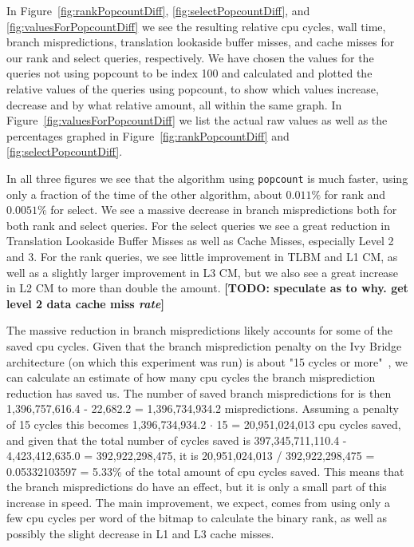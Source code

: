 In Figure~\ref{fig:rankPopcountDiff}, \ref{fig:selectPopcountDiff}, and \ref{fig:valuesForPopcountDiff} we see the resulting relative cpu cycles, wall time, branch mispredictions, translation lookaside buffer misses, and cache misses for our rank and select queries, respectively.
We have chosen the values for the queries not using popcount to be index 100 and calculated and plotted the relative values of the queries using popcount, to show which values increase, decrease and by what relative amount, all within the same graph.
In Figure~\ref{fig:valuesForPopcountDiff} we list the actual raw values as well as the percentages graphed in Figure~\ref{fig:rankPopcountDiff} and \ref{fig:selectPopcountDiff}.

In all three figures we see that the algorithm using \texttt{popcount} is much faster, using only a fraction of the time of the other algorithm, about $0.011\%$ for rank and $0.0051\%$ for select.
We see a massive decrease in branch mispredictions both for both rank and select queries. For the select queries we see a great reduction in Translation Lookaside Buffer Misses as well as Cache Misses, especially Level 2 and 3.
For the rank queries, we see little improvement in TLBM and L1 CM, as well as a slightly larger improvement in L3 CM, but we also see a great increase in L2 CM to more than double the amount.
\textbf{[TODO: speculate as to why. get level 2 data cache miss \textit{rate}]}


The massive reduction in branch mispredictions likely accounts for some of the saved cpu cycles.
Given that the branch misprediction penalty on the Ivy Bridge architecture (on which this experiment was run) is about "15 cycles or more"~\cite{agner}, we can calculate an estimate of how many cpu cycles the branch misprediction reduction has saved us.
The number of saved branch mispredictions for  is then 1,396,757,616.4 - 22,682.2 = 1,396,734,934.2 mispredictions. Assuming a penalty of 15 cycles this becomes 1,396,734,934.2 $\cdot$ 15 = 20,951,024,013 cpu cycles saved, and given that the total number of cycles saved is 397,345,711,110.4 - 4,423,412,635.0 = 392,922,298,475, it is 20,951,024,013 / 392,922,298,475 = 0.05332103597 = 5.33\% of the total amount of cpu cycles saved.
This means that the branch mispredictions do have an effect, but it is only a small part of this increase in speed. The main improvement, we expect, comes from using only a few cpu cycles per word of the bitmap to calculate the binary rank, as well as possibly the slight decrease in L1 and L3 cache misses.


